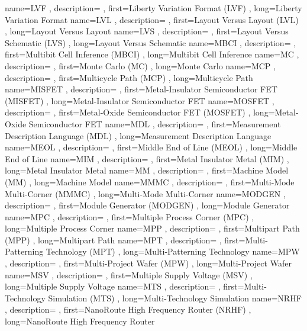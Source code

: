 { name={LVF}
, description={}
, first={Liberty Variation Format (LVF)}
, long={Liberty Variation Format}
}
{ name={LVL}
, description={}
, first={Layout Versus Layout (LVL)}
, long={Layout Versus Layout}
}
{ name={LVS}
, description={}
, first={Layout Versus Schematic (LVS)}
, long={Layout Versus Schematic}
}
{ name={MBCI}
, description={}
, first={Multibit Cell Inference (MBCI)}
, long={Multibit Cell Inference}
}
{ name={MC}
, description={}
, first={Monte Carlo (MC)}
, long={Monte Carlo}
}
{ name={MCP}
, description={}
, first={Multicycle Path (MCP)}
, long={Multicycle Path}
}
{ name={MISFET}
, description={}
, first={Metal-Insulator Semiconductor FET (MISFET)}
, long={Metal-Insulator Semiconductor FET}
}
{ name={MOSFET}
, description={}
, first={Metal-Oxide Semiconductor FET (MOSFET)}
, long={Metal-Oxide Semiconductor FET}
}
{ name={MDL}
, description={}
, first={Measurement Description Language (MDL)}
, long={Measurement Description Language}
}
{ name={MEOL}
, description={}
, first={Middle End of Line (MEOL)}
, long={Middle End of Line}
}
{ name={MIM}
, description={}
, first={Metal Insulator Metal (MIM)}
, long={Metal Insulator Metal}
}
{ name={MM}
, description={}
, first={Machine Model (MM)}
, long={Machine Model}
}
{ name={MMMC}
, description={}
, first={Multi-Mode Multi-Corner (MMMC)}
, long={Multi-Mode Multi-Corner}
}
{ name={MODGEN}
, description={}
, first={Module Generator (MODGEN)}
, long={Module Generator}
}
{ name={MPC}
, description={}
, first={Multiple Process Corner (MPC)}
, long={Multiple Process Corner}
}
{ name={MPP}
, description={}
, first={Multipart Path (MPP)}
, long={Multipart Path}
}
{ name={MPT}
, description={}
, first={Multi-Patterning Technology (MPT)}
, long={Multi-Patterning Technology}
}
{ name={MPW}
, description={}
, first={Multi-Project Wafer (MPW)}
, long={Multi-Project Wafer}
}
{ name={MSV}
, description={}
, first={Multiple Supply Voltage (MSV)}
, long={Multiple Supply Voltage}
}
{ name={MTS}
, description={}
, first={Multi-Technology Simulation (MTS)}
, long={Multi-Technology Simulation}
}
{ name={NRHF}
, description={}
, first={NanoRoute High Frequency Router (NRHF)}
, long={NanoRoute High Frequency Router}
}
